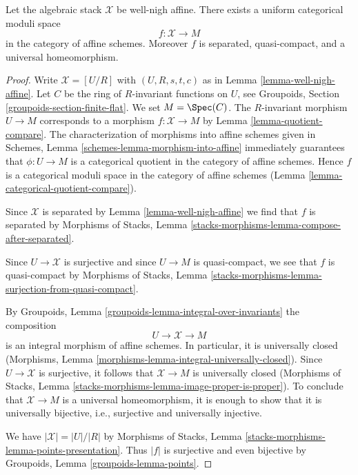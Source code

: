 \begin{lemma}
\label{lemma-well-nigh-affine-moduli-space}
Let the algebraic stack $\mathcal{X}$ be well-nigh affine. There exists
a uniform categorical moduli space
$$
f : \mathcal{X} \longrightarrow M
$$
in the category of affine schemes. Moreover
$f$ is separated, quasi-compact, and a universal homeomorphism.
\end{lemma}

\begin{proof}
Write $\mathcal{X} = [U/R]$ with $(U, R, s, t, c)$ as in
Lemma \ref{lemma-well-nigh-affine}. Let $C$ be the ring of
$R$-invariant functions on $U$, see
Groupoids, Section \ref{groupoids-section-finite-flat}.
We set $M = \Spec(C)$. The $R$-invariant morphism
$U \to M$ corresponds to a morphism $f : \mathcal{X} \to M$ by
Lemma \ref{lemma-quotient-compare}.
The characterization of morphisms into affine schemes given in
Schemes, Lemma \ref{schemes-lemma-morphism-into-affine}
immediately guarantees that $\phi : U \to M$ is a categorical
quotient in the category of affine schemes. Hence $f$ is a
categorical moduli space in the category of affine schemes
(Lemma \ref{lemma-categorical-quotient-compare}).

\medskip\noindent
Since $\mathcal{X}$ is separated by Lemma \ref{lemma-well-nigh-affine}
we find that $f$ is separated by Morphisms of Stacks, Lemma
\ref{stacks-morphisms-lemma-compose-after-separated}.

\medskip\noindent
Since $U \to \mathcal{X}$ is surjective and since $U \to M$ is quasi-compact,
we see that $f$ is quasi-compact by Morphisms of Stacks, Lemma
\ref{stacks-morphisms-lemma-surjection-from-quasi-compact}.

\medskip\noindent
By Groupoids, Lemma \ref{groupoids-lemma-integral-over-invariants}
the composition
$$
U \to \mathcal{X} \to M
$$
is an integral morphism of affine schemes. In particular, it is
universally closed
(Morphisms, Lemma \ref{morphisms-lemma-integral-universally-closed}).
Since $U \to \mathcal{X}$ is surjective, it follows that $\mathcal{X} \to M$
is universally closed (Morphisms of Stacks, Lemma
\ref{stacks-morphisms-lemma-image-proper-is-proper}).
To conclude that $\mathcal{X} \to M$ is a universal homeomorphism,
it is enough to show that it is universally bijective, i.e.,
surjective and universally injective.

\medskip\noindent
We have $|\mathcal{X}| = |U|/|R|$ by
Morphisms of Stacks, Lemma \ref{stacks-morphisms-lemma-points-presentation}.
Thus $|f|$ is surjective and even bijective
by Groupoids, Lemma \ref{groupoids-lemma-points}.


\end{proof}
